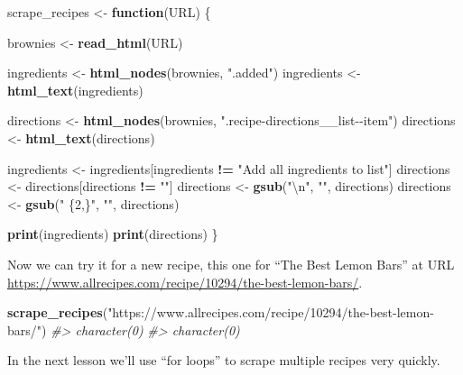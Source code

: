 \documentclass[
  12pt,
]{book}
\newenvironment{Shaded}{\begin{snugshade}}{\end{snugshade}}
\newcommand{\CharTok}[1]{\textcolor[rgb]{0.31,0.60,0.02}{#1}}
\newcommand{\CommentTok}[1]{\textcolor[rgb]{0.56,0.35,0.01}{\textit{#1}}}
\newcommand{\ControlFlowTok}[1]{\textcolor[rgb]{0.13,0.29,0.53}{\textbf{#1}}}
\newcommand{\KeywordTok}[1]{\textcolor[rgb]{0.13,0.29,0.53}{\textbf{#1}}}
\newcommand{\NormalTok}[1]{#1}
\newcommand{\OperatorTok}[1]{\textcolor[rgb]{0.81,0.36,0.00}{\textbf{#1}}}
\newcommand{\StringTok}[1]{\textcolor[rgb]{0.31,0.60,0.02}{#1}}
\begin{document}
\begin{Shaded}
\begin{Highlighting}[]
\NormalTok{scrape\_recipes <{-}}\StringTok{ }\ControlFlowTok{function}\NormalTok{(URL) \{}
  
\NormalTok{  brownies <{-}}\StringTok{ }\KeywordTok{read\_html}\NormalTok{(URL)}
  
\NormalTok{  ingredients <{-}}\StringTok{ }\KeywordTok{html\_nodes}\NormalTok{(brownies, }\StringTok{".added"}\NormalTok{)}
\NormalTok{  ingredients <{-}}\StringTok{ }\KeywordTok{html\_text}\NormalTok{(ingredients)}
  
\NormalTok{  directions <{-}}\StringTok{ }\KeywordTok{html\_nodes}\NormalTok{(brownies, }\StringTok{".recipe{-}directions\_\_list{-}{-}item"}\NormalTok{)}
\NormalTok{  directions <{-}}\StringTok{ }\KeywordTok{html\_text}\NormalTok{(directions)}
  
\NormalTok{  ingredients <{-}}\StringTok{ }\NormalTok{ingredients[ingredients }\OperatorTok{!=}\StringTok{ "Add all ingredients to list"}\NormalTok{]}
\NormalTok{  directions  <{-}}\StringTok{ }\NormalTok{directions[directions }\OperatorTok{!=}\StringTok{ ""}\NormalTok{]}
\NormalTok{  directions  <{-}}\StringTok{ }\KeywordTok{gsub}\NormalTok{(}\StringTok{"}\CharTok{\textbackslash{}n}\StringTok{"}\NormalTok{, }\StringTok{""}\NormalTok{, directions)}
\NormalTok{  directions  <{-}}\StringTok{ }\KeywordTok{gsub}\NormalTok{(}\StringTok{" \{2,\}"}\NormalTok{, }\StringTok{""}\NormalTok{, directions)}
  
  \KeywordTok{print}\NormalTok{(ingredients)}
  \KeywordTok{print}\NormalTok{(directions)}
\NormalTok{\}}
\end{Highlighting}
\end{Shaded}

Now we can try it for a new recipe, this one for ``The Best Lemon Bars'' at URL \url{https://www.allrecipes.com/recipe/10294/the-best-lemon-bars/}.

\begin{Shaded}
\begin{Highlighting}[]
\KeywordTok{scrape\_recipes}\NormalTok{(}\StringTok{"https://www.allrecipes.com/recipe/10294/the{-}best{-}lemon{-}bars/"}\NormalTok{)}
\CommentTok{\#> character(0)}
\CommentTok{\#> character(0)}
\end{Highlighting}
\end{Shaded}

In the next lesson we'll use ``for loops'' to scrape multiple recipes very quickly.
\end{document}
